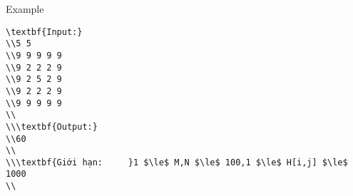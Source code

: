 Example
\begin{verbatim}
\textbf{Input:}
\\5 5
\\9 9 9 9 9
\\9 2 2 2 9
\\9 2 5 2 9
\\9 2 2 2 9
\\9 9 9 9 9
\\
\\\textbf{Output:}
\\60
\\
\\\textbf{Giới hạn:     }1 $\le$ M,N $\le$ 100,1 $\le$ H[i,j] $\le$ 1000
\\\end{verbatim}